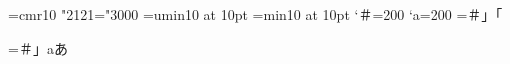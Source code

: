 \font\cmr=cmr10\cmr
\ifx\kanjiskip\undefined\else
  \ifnum\jis"2121="3000
    \jfont\jpy=umin10 at 10pt\jpy
  \else
    \jfont\jpy=min10 at 10pt\jpy
  \fi
\fi
\postbreakpenalty`＃=200
\postbreakpenalty`a=200
=\hbox{＃」「\showlists}

=\hbox{＃\unpenalty 」a\relax あ\showlists}


\bye
